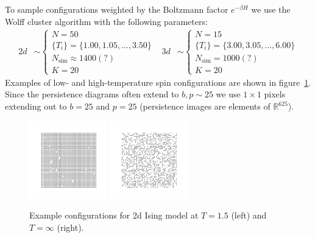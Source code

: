 \documentclass[11pt]{article}
\begin{document}
To sample configurations weighted by the Boltzmann factor $e^{-\beta H}$ we use the Wolff cluster algorithm with the following parameters:
\begin{align}
    2d&\sim\left\{\begin{array}{l}
        N = 50\\
        \{T_i\} = \{1.00,1.05,\ldots,3.50\}\\
        N_\text{sim} \approx 1400 (?)\\
        K = 20
    \end{array}\right. & 3d&\sim\left\{\begin{array}{l}
        N = 15\\
        \{T_i\} = \{3.00,3.05,\ldots,6.00\}\\
        N_\text{sim} = 1000 (?)\\
        K = 20
    \end{array}\right.
\end{align}
Examples of low- and high-temperature spin configurations are shown in figure~\ref{fig:IsingExampleConfigs}. Since the persistence diagrams often extend to $b,p\sim 25$ we use $1\times 1$ pixels extending out to $b=25$ and $p=25$ (persistence images are elements of $\mathbb{R}^{625}$).

\begin{figure}[h]
    \centering
    \includegraphics[width=0.3\textwidth]{ising_images/ising_T=150.png}
    \includegraphics[width=0.3\textwidth]{ising_images/ising_T=inf.png}
    \caption{Example configurations for 2d Ising model at $T=1.5$ (left) and $T=\infty$ (right).}
    \label{fig:IsingExampleConfigs}
\end{figure}
\end{document}
